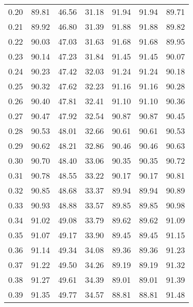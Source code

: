 \begin{tabular}{|c|c|c|c|c|c|c|}
      0.20 &     89.81 &     46.56 &      31.18 &   91.94 &      91.94 &         89.71 \\
      0.21 &     89.92 &     46.80 &      31.39 &   91.88 &      91.88 &         89.82 \\
      0.22 &     90.03 &     47.03 &      31.63 &   91.68 &      91.68 &         89.95 \\
      0.23 &     90.14 &     47.23 &      31.84 &   91.45 &      91.45 &         90.07 \\
      0.24 &     90.23 &     47.42 &      32.03 &   91.24 &      91.24 &         90.18 \\
      0.25 &     90.32 &     47.62 &      32.23 &   91.16 &      91.16 &         90.28 \\
      0.26 &     90.40 &     47.81 &      32.41 &   91.10 &      91.10 &         90.36 \\
      0.27 &     90.47 &     47.92 &      32.54 &   90.87 &      90.87 &         90.45 \\
      0.28 &     90.53 &     48.01 &      32.66 &   90.61 &      90.61 &         90.53 \\
      0.29 &     90.62 &     48.21 &      32.86 &   90.46 &      90.46 &         90.63 \\
      0.30 &     90.70 &     48.40 &      33.06 &   90.35 &      90.35 &         90.72 \\
      0.31 &     90.78 &     48.55 &      33.22 &   90.17 &      90.17 &         90.81 \\
      0.32 &     90.85 &     48.68 &      33.37 &   89.94 &      89.94 &         90.89 \\
      0.33 &     90.93 &     48.88 &      33.57 &   89.85 &      89.85 &         90.98 \\
      0.34 &     91.02 &     49.08 &      33.79 &   89.62 &      89.62 &         91.09 \\
      0.35 &     91.07 &     49.17 &      33.90 &   89.45 &      89.45 &         91.15 \\
      0.36 &     91.14 &     49.34 &      34.08 &   89.36 &      89.36 &         91.23 \\
      0.37 &     91.22 &     49.50 &      34.26 &   89.19 &      89.19 &         91.32 \\
      0.38 &     91.27 &     49.61 &      34.39 &   89.01 &      89.01 &         91.39 \\
      0.39 &     91.35 &     49.77 &      34.57 &   88.81 &      88.81 &         91.48 \\

\end{tabular}

